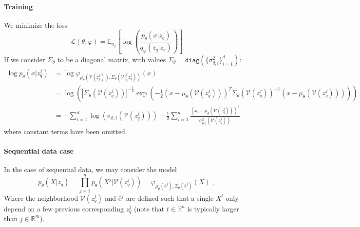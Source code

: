 \documentclass{article}
\newcommand{\rset}{\ensuremath{\mathbb{R}}}
\newcommand{\eqsp}{\;}
\newcommand{\vois}{\mathcal{V}}
\begin{document}
\paragraph{Training}
We minimize the loss
$$
\mathcal{L}(\theta, \varphi) = \mathbb{E}_{q_\varphi} \left[ \log\left(\frac{p_\theta(x|z_q)}{q_\varphi(z_q|z_e)}\right) \right]
$$
If we consider $\Sigma_\theta$ to be a diagonal matrix, with values $\Sigma_\theta = \texttt{diag}(\{\sigma_{\theta, i}^2\}_{i=1}^d)$:
\begin{align*}
    \log p_\theta(x|z_q^j) &= \log \varphi_{\mu_\theta(\vois(z_q^j)),\Sigma_\theta(\vois(z_q^j))}(x) \\
			   &= \log\left(|\Sigma_\theta(\vois(z_q^j))|^{-\frac{1}{2}} \exp\left(-\frac{1}{2}(x - \mu_\theta(\vois(z_q^j)))^T \Sigma_\theta(\vois(z_q^j))^{-1} (x - \mu_\theta(\vois(z_q^j))) \right)\right) \\
			   &= -\sum_{i=1}^d \log(\sigma_{\theta, i}(\vois(z_q^j))) -\frac{1}{2} \sum_{i=1}^d \frac{(x_i - \mu_\theta(\vois(z_q^j)))^2}{\sigma_{\theta, i}^2(\vois(z_q^j))}
\end{align*}
where constant terms have been omitted.

\paragraph{Sequential data case}
In the case of sequential data, we may consider the model
$$
p_{\theta}(X|z_q) = \prod_{j=1}^n p_{\theta}(X^j|\vois(z_q^j)) = \varphi_{\mu_\theta(\bar e^j),\Sigma_\theta(\bar e^j)}(X)\eqsp,
$$
Where the neighborhood $\vois(z_q^j)$ and $\bar e^j$ are defined such that a single $X^t$ only depend on a few previous corresponding $z_q^j$ (note that $t \in \rset^n$ is typically larger than $j \in \rset^m$).
\end{document}
